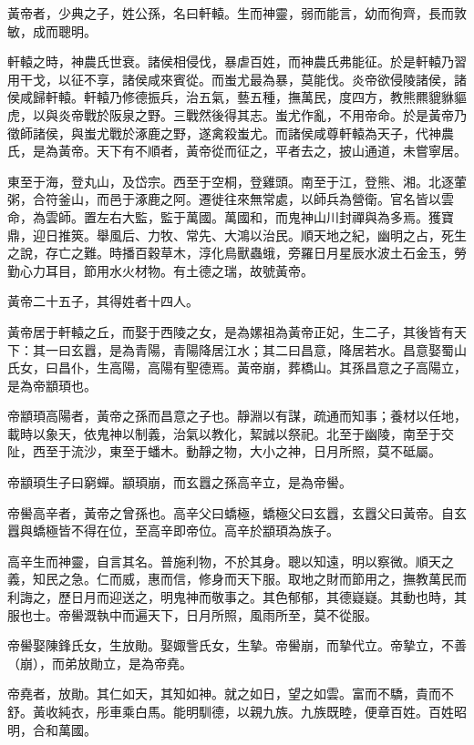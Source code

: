 
\begin{pinyinscope}
黃帝者，少典之子，姓公孫，名曰軒轅。生而神靈，弱而能言，幼而徇齊，長而敦敏，成而聰明。

軒轅之時，神農氏世衰。諸侯相侵伐，暴虐百姓，而神農氏弗能征。於是軒轅乃習用干戈，以征不享，諸侯咸來賓從。而蚩尤最為暴，莫能伐。炎帝欲侵陵諸侯，諸侯咸歸軒轅。軒轅乃修德振兵，治五氣，藝五種，撫萬民，度四方，教熊羆貔貅貙虎，以與炎帝戰於阪泉之野。三戰然後得其志。蚩尤作亂，不用帝命。於是黃帝乃徵師諸侯，與蚩尤戰於涿鹿之野，遂禽殺蚩尤。而諸侯咸尊軒轅為天子，代神農氏，是為黃帝。天下有不順者，黃帝從而征之，平者去之，披山通道，未嘗寧居。

東至于海，登丸山，及岱宗。西至于空桐，登雞頭。南至于江，登熊、湘。北逐葷粥，合符釜山，而邑于涿鹿之阿。遷徙往來無常處，以師兵為營衛。官名皆以雲命，為雲師。置左右大監，監于萬國。萬國和，而鬼神山川封禪與為多焉。獲寶鼎，迎日推筴。舉風后、力牧、常先、大鴻以治民。順天地之紀，幽明之占，死生之說，存亡之難。時播百穀草木，淳化鳥獸蟲蛾，旁羅日月星辰水波土石金玉，勞勤心力耳目，節用水火材物。有土德之瑞，故號黃帝。

黃帝二十五子，其得姓者十四人。

黃帝居于軒轅之丘，而娶于西陵之女，是為嫘祖為黃帝正妃，生二子，其後皆有天下：其一曰玄囂，是為青陽，青陽降居江水；其二曰昌意，降居若水。昌意娶蜀山氏女，曰昌仆，生高陽，高陽有聖德焉。黃帝崩，葬橋山。其孫昌意之子高陽立，是為帝顓頊也。

帝顓頊高陽者，黃帝之孫而昌意之子也。靜淵以有謀，疏通而知事；養材以任地，載時以象天，依鬼神以制義，治氣以教化，絜誠以祭祀。北至于幽陵，南至于交阯，西至于流沙，東至于蟠木。動靜之物，大小之神，日月所照，莫不砥屬。

帝顓頊生子曰窮蟬。顓頊崩，而玄囂之孫高辛立，是為帝嚳。

帝嚳高辛者，黃帝之曾孫也。高辛父曰蟜極，蟜極父曰玄囂，玄囂父曰黃帝。自玄囂與蟜極皆不得在位，至高辛即帝位。高辛於顓頊為族子。

高辛生而神靈，自言其名。普施利物，不於其身。聰以知遠，明以察微。順天之義，知民之急。仁而威，惠而信，修身而天下服。取地之財而節用之，撫教萬民而利誨之，歷日月而迎送之，明鬼神而敬事之。其色郁郁，其德嶷嶷。其動也時，其服也士。帝嚳溉執中而遍天下，日月所照，風雨所至，莫不從服。

帝嚳娶陳鋒氏女，生放勛。娶娵訾氏女，生摯。帝嚳崩，而摯代立。帝摯立，不善（崩），而弟放勛立，是為帝堯。

帝堯者，放勛。其仁如天，其知如神。就之如日，望之如雲。富而不驕，貴而不舒。黃收純衣，彤車乘白馬。能明馴德，以親九族。九族既睦，便章百姓。百姓昭明，合和萬國。


\end{pinyinscope}
